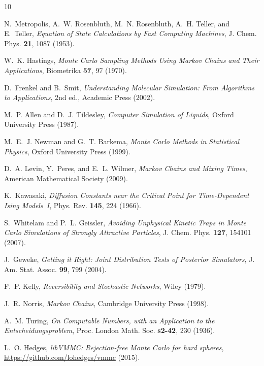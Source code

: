 \documentclass[twocolumn,10pt]{article}
\begin{document}
\begin{thebibliography}{10}

N.~Metropolis, A.~W. Rosenbluth, M.~N. Rosenbluth, A.~H. Teller, and
E.~Teller,
\textit{Equation of State Calculations by Fast Computing Machines},
J. Chem. Phys. \textbf{21}, 1087 (1953).

W.~K. Hastings,
\textit{Monte Carlo Sampling Methods Using Markov Chains and Their Applications},
Biometrika \textbf{57}, 97 (1970).

D.~Frenkel and B.~Smit,
\textit{Understanding Molecular Simulation: From Algorithms to Applications},
2nd ed., Academic Press (2002).

M.~P. Allen and D.~J. Tildesley,
\textit{Computer Simulation of Liquids},
Oxford University Press (1987).

M.~E.~J. Newman and G.~T. Barkema,
\textit{Monte Carlo Methods in Statistical Physics},
Oxford University Press (1999).

D.~A. Levin, Y.~Peres, and E.~L. Wilmer,
\textit{Markov Chains and Mixing Times},
American Mathematical Society (2009).

K.~Kawasaki,
\textit{Diffusion Constants near the Critical Point for Time-Dependent Ising
Models~I},
Phys. Rev. \textbf{145}, 224 (1966).

S.~Whitelam and P.~L. Geissler,
\textit{Avoiding Unphysical Kinetic Traps in Monte Carlo Simulations of
Strongly Attractive Particles},
J. Chem. Phys. \textbf{127}, 154101 (2007).

J.~Geweke,
\textit{Getting it Right: Joint Distribution Tests of Posterior Simulators},
J. Am. Stat. Assoc. \textbf{99}, 799 (2004).

F.~P. Kelly,
\textit{Reversibility and Stochastic Networks},
Wiley (1979).

J.~R. Norris,
\textit{Markov Chains},
Cambridge University Press (1998).

A.~M. Turing,
\textit{On Computable Numbers, with an Application to the
Entscheidungsproblem},
Proc. London Math. Soc. \textbf{s2-42}, 230 (1936).

L.~O. Hedges,
\textit{libVMMC: Rejection-free Monte Carlo for hard spheres},
\url{https://github.com/lohedges/vmmc} (2015).


\end{thebibliography}
\end{document}
